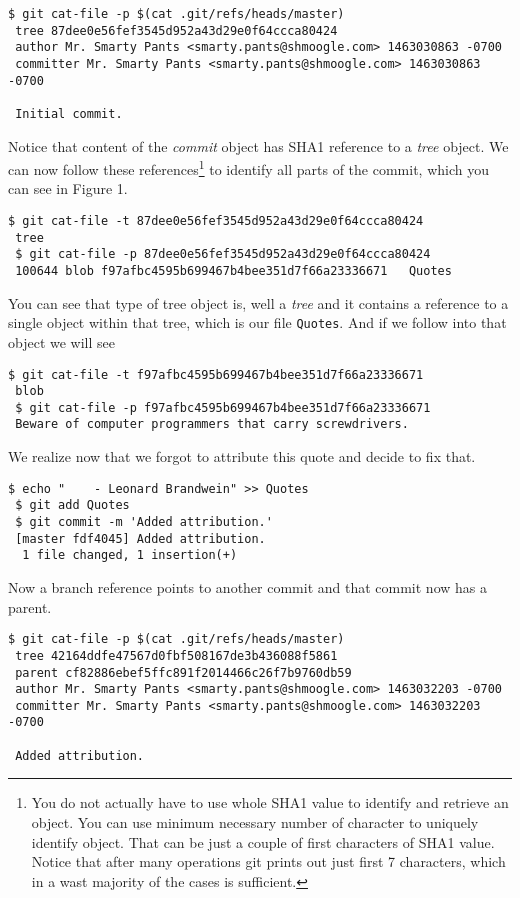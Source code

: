 \documentclass{article}
\theoremstyle{definition}
\begin{document}
        \begin{Verbatim}[frame=single]
 $ git cat-file -p $(cat .git/refs/heads/master)
 tree 87dee0e56fef3545d952a43d29e0f64ccca80424
 author Mr. Smarty Pants <smarty.pants@shmoogle.com> 1463030863 -0700
 committer Mr. Smarty Pants <smarty.pants@shmoogle.com> 1463030863 -0700

 Initial commit.
        \end{Verbatim}
        Notice that content of the {\em commit} object has SHA1 reference to a {\em tree} object. We can now follow these
        references\footnote{You do not actually have to use whole SHA1 value to identify and retrieve an object. You can use
        minimum necessary number of character to uniquely identify object. That can be just a couple of first characters
        of SHA1 value. Notice that after many operations git prints out just first 7 characters, which in a wast majority of
        the cases is sufficient.} to identify all parts of the commit, which you can see in Figure 1.

        \begin{Verbatim}[frame=single]
 $ git cat-file -t 87dee0e56fef3545d952a43d29e0f64ccca80424
 tree
 $ git cat-file -p 87dee0e56fef3545d952a43d29e0f64ccca80424
 100644 blob f97afbc4595b699467b4bee351d7f66a23336671   Quotes
        \end{Verbatim}
        You can see that type of tree object is, well a {\em tree} and it contains a reference to a single object
        within that tree, which is our file \texttt{Quotes}. And if we follow into that object we will see

        \begin{Verbatim}[frame=single]
 $ git cat-file -t f97afbc4595b699467b4bee351d7f66a23336671
 blob
 $ git cat-file -p f97afbc4595b699467b4bee351d7f66a23336671
 Beware of computer programmers that carry screwdrivers.
        \end{Verbatim}
        We realize now that we forgot to attribute this quote and decide to fix that.

        \begin{Verbatim}[frame=single]
 $ echo "    - Leonard Brandwein" >> Quotes
 $ git add Quotes
 $ git commit -m 'Added attribution.'
 [master fdf4045] Added attribution.
  1 file changed, 1 insertion(+)
        \end{Verbatim}
        Now a branch reference points to another commit and that commit now has a parent.
        \begin{Verbatim}[frame=single]
 $ git cat-file -p $(cat .git/refs/heads/master)
 tree 42164ddfe47567d0fbf508167de3b436088f5861
 parent cf82886ebef5ffc891f2014466c26f7b9760db59
 author Mr. Smarty Pants <smarty.pants@shmoogle.com> 1463032203 -0700
 committer Mr. Smarty Pants <smarty.pants@shmoogle.com> 1463032203 -0700

 Added attribution.
        \end{Verbatim}
\end{document}
